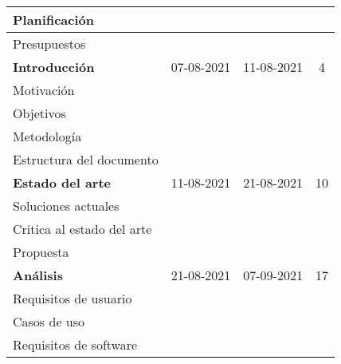 \begin{longtable}[c]{lcc|c|}
	\multicolumn{1}{|l|}{Planificación}                 & \multicolumn{1}{c|}{}           &                                     &     \\ \hline
	\multicolumn{1}{|l|}{Presupuestos}                  & \multicolumn{1}{c|}{}           &                                     &     \\ \hline
	\multicolumn{1}{|l|}{\textbf{Introducción}}         & \multicolumn{1}{c|}{07-08-2021} & 11-08-2021                          & 4   \\ \hline
	\multicolumn{1}{|l|}{Motivación}                    & \multicolumn{1}{c|}{}           &                                     &     \\ \hline
	\multicolumn{1}{|l|}{Objetivos}                     & \multicolumn{1}{c|}{}           &                                     &     \\ \hline
	\multicolumn{1}{|l|}{Metodología}                   & \multicolumn{1}{c|}{}           &                                     &     \\ \hline
	\multicolumn{1}{|l|}{Estructura del documento}      & \multicolumn{1}{c|}{}           &                                     &     \\ \hline
	\multicolumn{1}{|l|}{\textbf{Estado del arte}}      & \multicolumn{1}{c|}{11-08-2021} & 21-08-2021                          & 10  \\ \hline
	\multicolumn{1}{|l|}{Soluciones actuales}           & \multicolumn{1}{c|}{}           &                                     &     \\ \hline
	\multicolumn{1}{|l|}{Critica al estado del arte}    & \multicolumn{1}{c|}{}           &                                     &     \\ \hline
	\multicolumn{1}{|l|}{Propuesta}                     & \multicolumn{1}{c|}{}           &                                     &     \\ \hline
	\multicolumn{1}{|l|}{\textbf{Análisis}}             & \multicolumn{1}{c|}{21-08-2021} & 07-09-2021                          & 17  \\ \hline
	\multicolumn{1}{|l|}{Requisitos de usuario}         & \multicolumn{1}{c|}{}           &                                     &     \\ \hline
	\multicolumn{1}{|l|}{Casos de uso}                  & \multicolumn{1}{c|}{}           &                                     &     \\ \hline
	\multicolumn{1}{|l|}{Requisitos de software}        & \multicolumn{1}{c|}{}           &                                     &     \\ \hline

\end{longtable}
